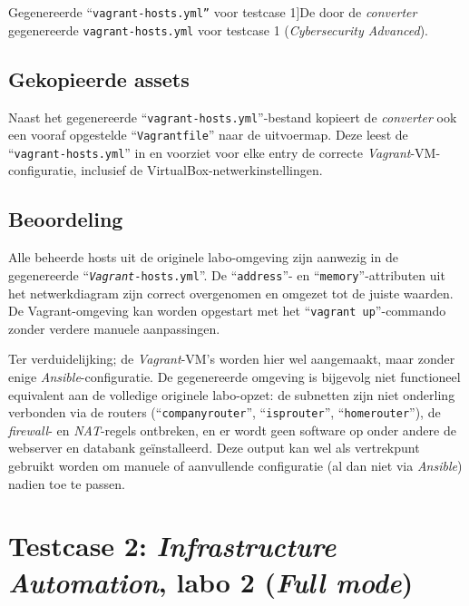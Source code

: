 \begin{codeblock}
    \inputminted{yaml}{../project_files/output/cybersec_adv_env/vagrant-hosts.yml}
    \caption[Gegenereerde ``\texttt{vagrant-hosts.yml''} voor testcase 1]{De door de \emph{converter} gegenereerde \texttt{vagrant-hosts.yml} voor testcase 1 (\emph{Cybersecurity Advanced}).}
    \label{code:vagrant_hosts_cybersec}
\end{codeblock}

\subsection{Gekopieerde assets}%
\label{subsec:testcase1_assets}

Naast het gegenereerde ``\texttt{vagrant-hosts.yml}''-bestand kopieert de \emph{converter} ook een vooraf opgestelde ``\texttt{Vagrantfile}'' naar de uitvoermap. Deze leest de ``\texttt{vagrant-hosts.yml}'' in en voorziet voor elke entry de correcte \emph{Vagrant}-VM-configuratie, inclusief de VirtualBox-netwerkinstellingen.

\subsection{Beoordeling}%
\label{subsec:testcase1_beoordeling}

Alle beheerde hosts uit de originele labo-omgeving zijn aanwezig in de gegenereerde ``\texttt{\emph{Vagrant}-hosts.yml}''. De ``\texttt{address}''- en ``\texttt{memory}''-attributen uit het netwerkdiagram zijn correct overgenomen en omgezet tot de juiste waarden.
De Vagrant-omgeving kan worden opgestart met het ``\texttt{vagrant up}''-commando zonder verdere manuele aanpassingen.

Ter verduidelijking; de \emph{Vagrant}-VM's worden hier wel aangemaakt, maar zonder enige \emph{Ansible}-configuratie. De gegenereerde omgeving is bijgevolg niet functioneel equivalent aan de volledige originele labo-opzet: de subnetten zijn niet onderling verbonden via de routers (``\texttt{companyrouter}'', ``\texttt{isprouter}'', ``\texttt{homerouter}''), de \emph{firewall}- en \emph{NAT}-regels ontbreken, en er wordt geen software op onder andere de webserver en databank geïnstalleerd. Deze output kan wel als vertrekpunt gebruikt worden om manuele of aanvullende configuratie (al dan niet via \emph{Ansible}) nadien toe te passen.

\section{Testcase 2: \emph{Infrastructure Automation}, labo 2 (\emph{Full mode})}%
\label{sec:testcase2}

